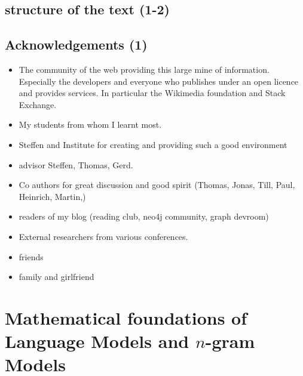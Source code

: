 \documentclass[•]{book}
\begin{document}
\section{structure of the text (1-2)}

\section{Acknowledgements (1)}
\begin{itemize}
\item The community of the web providing this large mine of information. Especially the developers and everyone who publishes under an open licence and provides services. In particular the Wikimedia foundation and Stack Exchange. 
\item My students from whom I learnt most.
\item Steffen and Institute for creating and providing such a good environment
\item advisor Steffen, Thomas, Gerd.
\item Co authors for great discussion and good spirit (Thomas, Jonas, Till, Paul, Heinrich, Martin,)
\item readers of my blog (reading club, neo4j community, graph devroom)
\item External researchers from various conferences.\item friends
\item family and girlfriend

\end{itemize}

\newcommand{\intersection}{\cap}
\newcommand{\union}{\cup}
\newcommand{\skp}{\_}
\newcommand{\pow}[1]{2^{#1}}



\chapter{Mathematical foundations of Language Models and $n$-gram Models}
\end{document}
